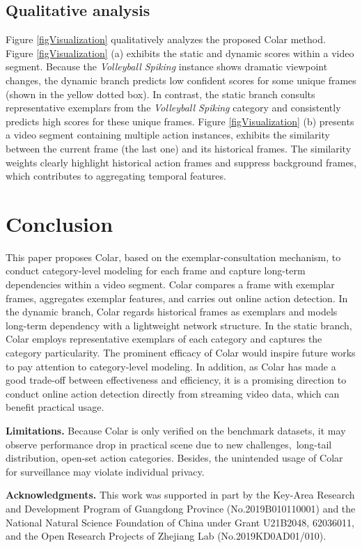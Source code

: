 \documentclass[10pt,twocolumn,letterpaper]{article}
\begin{document}
\subsection{Qualitative analysis}
Figure \ref{figVisualization} qualitatively analyzes the proposed Colar method. Figure \ref{figVisualization} (a) exhibits the static and dynamic scores within a video segment. Because the \textit{Volleyball Spiking} instance shows dramatic viewpoint changes, the dynamic branch predicts low confident scores for some unique frames (shown in the yellow dotted box). In contrast, the static branch consults representative exemplars from the \textit{Volleyball Spiking} category and consistently predicts high scores for these unique frames. Figure \ref{figVisualization} (b) presents a video segment containing multiple action instances, exhibits the similarity between the current frame (the last one) and its historical frames. The similarity weights clearly highlight historical action frames and suppress background frames, which contributes to aggregating temporal features.


\section{Conclusion}
This paper proposes Colar, based on the exemplar-consultation mechanism, to conduct category-level modeling for each frame and capture long-term dependencies within a video segment. Colar compares a frame with exemplar frames, aggregates exemplar features, and carries out online action detection. In the dynamic branch, Colar regards historical frames as exemplars and models long-term dependency with a lightweight network structure. In the static branch, Colar employs representative exemplars of each category and captures the category particularity. The prominent efficacy of Colar would inspire future works to pay attention to category-level modeling. In addition, as Colar has made a good trade-off between effectiveness and efficiency, it is a promising direction to conduct online action detection directly from streaming video data, which can benefit practical usage.

\noindent \textbf{Limitations.} Because Colar is only verified on the benchmark datasets, it may observe performance drop in practical scene due to new challenges,~\eg long-tail distribution, open-set action categories. Besides, the unintended usage of Colar for surveillance may violate individual privacy.

\noindent
\textbf{Acknowledgments.} This work was supported in part by the Key-Area Research and Development Program of Guangdong Province (No.2019B010110001) and the National Natural Science Foundation of China under Grant U21B2048, 62036011, and the Open Research Projects of Zhejiang Lab (No.2019KD0AD01/010).

{\small


}
\end{document}

